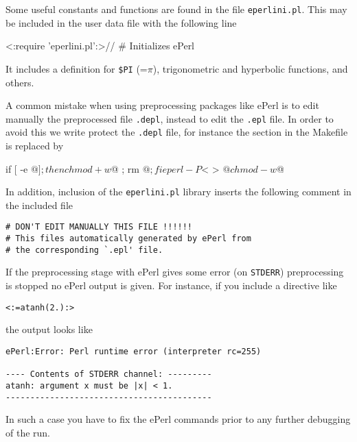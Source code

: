 
Some useful constants and functions are found in the file
\verb+eperlini.pl+. This may be included in the user data file with
the following line

\begin{verb}
<:require 'eperlini.pl':>// # Initializes ePerl 
\end{verb}

It includes a definition for {\tt \$PI} (=$\pi$), trigonometric and
hyperbolic functions, and others. 

A common mistake when using preprocessing packages like ePerl is to
edit manually the preprocessed file \verb+.depl+, instead to edit the 
\verb+.epl+ file. In order to avoid this we write protect the
\verb+.depl+ file, for instance the section in the Makefile is
replaced by 
%
\begin{verb}
	if [ -e $@ ] ; then chmod +w $@ ; rm $@ ; fi
	eperl -P $< > $@
	chmod -w $@
\end{verb}
%
In addition, inclusion of the \verb+eperlini.pl+ library inserts the
following comment in the included file
%
\begin{verbatim}
# DON'T EDIT MANUALLY THIS FILE !!!!!!
# This files automatically generated by ePerl from 
# the corresponding `.epl' file. 
\end{verbatim}


If the preprocessing stage with ePerl gives some error (on
\verb+STDERR+) preprocessing is stopped no ePerl output is given. For
instance, if you include a directive like 
%
\begin{verbatim}
<:=atanh(2.):>
\end{verbatim}
%
the output looks like
%
\begin{verbatim}
ePerl:Error: Perl runtime error (interpreter rc=255)

---- Contents of STDERR channel: ---------
atanh: argument x must be |x| < 1.
------------------------------------------
\end{verbatim}
%
In such a case you have to fix the ePerl commands prior to any further
debugging of the \pfem{} run. 

